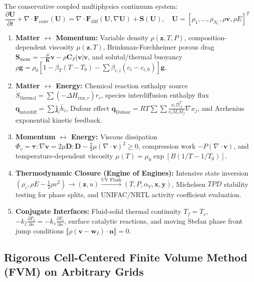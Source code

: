 \documentclass[11pt,a4paper]{article}
\begin{document}
The conservative coupled multiphysics continuum system:
\begin{equation}
\frac{\partial \mathbf{U}}{\partial t} + \nabla \cdot \mathbf{F}_{\text{conv}}(\mathbf{U}) = \nabla \cdot \mathbf{F}_{\text{diff}}(\mathbf{U}, \nabla \mathbf{U}) + \mathbf{S}(\mathbf{U}), \quad \mathbf{U} = [\rho_1, \dots, \rho_{N_c}, \rho \mathbf{v}, \rho E]^T
\end{equation}
\begin{enumerate}[leftmargin=*]
    \item \textbf{Matter $\leftrightarrow$ Momentum:} Variable density $\rho(\mathbf{z}, T, P)$, composition-dependent viscosity $\mu(\mathbf{z}, T)$, Brinkman-Forchheimer porous drag $\mathbf{S}_{\text{mom}} = -\frac{\mu}{\mathbf{K}} \mathbf{v} - \rho \mathbf{C}_F |\mathbf{v}|\mathbf{v}$, and solutal/thermal buoyancy $\rho \mathbf{g} = \rho_0 [1 - \beta_T(T - T_0) - \sum \beta_{c,i}(c_i - c_{i,0})]\mathbf{g}$.
    \item \textbf{Matter $\leftrightarrow$ Energy:} Chemical reaction enthalpy source $\dot{S}_{\text{thermal}} = \sum (-\Delta H_{\text{rxn},r}) r_r$, species interdiffusion enthalpy flux $\mathbf{q}_{\text{interdiff}} = \sum \mathbf{j}_i \bar{h}_i$, Dufour effect $\mathbf{q}_{\text{Dufour}} = R T \sum \sum \frac{x_i \mathcal{D}_{ij}^T}{c_t M_i M_j} \nabla x_j$, and Arrhenius exponential kinetic feedback.
    \item \textbf{Momentum $\leftrightarrow$ Energy:} Viscous dissipation $\Phi_v = \boldsymbol{\tau} : \nabla \mathbf{v} = 2 \mu \mathbf{D} : \mathbf{D} - \frac{2}{3} \mu (\nabla \cdot \mathbf{v})^2 \ge 0$, compression work $-P(\nabla \cdot \mathbf{v})$, and temperature-dependent viscosity $\mu(T) = \mu_0 \exp[B(1/T - 1/T_0)]$.
    \item \textbf{Thermodynamic Closure (Engine of Engines):} Intensive state inversion $(\rho_i, \rho E - \frac{1}{2}\rho v^2) \to (\mathbf{z}, u) \xrightarrow{\text{UV Flash}} (T, P, \alpha_V, \mathbf{x}, \mathbf{y})$, Michelsen $TPD$ stability testing for phase splits, and UNIFAC/NRTL activity coefficient evaluation.
    \item \textbf{Conjugate Interfaces:} Fluid-solid thermal continuity $T_f = T_s$, $-k_f \frac{\partial T_f}{\partial n} = -k_s \frac{\partial T_s}{\partial n}$, surface catalytic reactions, and moving Stefan phase front jump conditions $\llbracket \rho(\mathbf{v} - \mathbf{w}_I)\cdot \mathbf{n} \rrbracket = 0$.
\end{enumerate}

\subsection{Rigorous Cell-Centered Finite Volume Method (FVM) on Arbitrary Grids}
\end{document}

